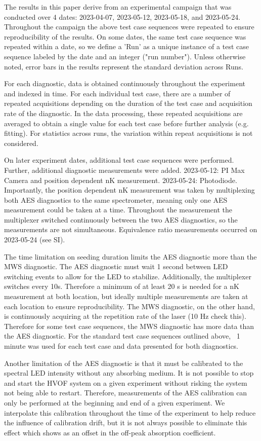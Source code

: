 The results in this paper derive from an experimental campaign that was conducted over 4 dates: 2023-04-07, 2023-05-12, 2023-05-18, and 2023-05-24. Throughout the campaign the above test case sequences were repeated to ensure reproducibility of the results. On some dates, the same test case sequence was repeated within a date, so we define a 'Run' as a unique instance of a test case sequence labeled by the date and an integer ("run number").  Unless otherwise noted, error bars in the results represent the standard deviation across Runs. 

For each diagnostic, data is obtained continuously throughout the experiment and indexed in time. For each individual test case, there are a number of repeated acquisitions depending on the duration of the test case and acquisition rate of the diagnostic. In the data processing, these repeated acquisitions are averaged to obtain a single value for each test case before further analysis (e.g. fitting). For statistics across runs, the variation within repeat acquisitions is not considered. 

On later experiment dates, additional test case sequences were performed. Further, additional diagnostic measurements were added. 2023-05-12: PI Max Camera and position dependent nK measurement. 2023-05-24: Photodiode. Importantly, the position dependent nK measurement was taken by multiplexing both AES diagnostics to the same spectrometer, meaning only one AES measurement could be taken at a time. Throughout the measurement the multiplexer switched continuously between the two AES diagnostics, so the measurements are not simultaneous. Equivalence ratio measurements occurred on 2023-05-24 (see SI). 

The time limitation on seeding duration limits the AES diagnostic more than the MWS diagnostic. The AES diagnostic must wait 1 second between LED switching events to allow for the LED to stabilize. Additionally, the multiplexer switches every 10s. Therefore a minimum of at least 20 s is needed for a nK measurement at both location, but ideally multiple measurements are taken at each location to ensure reproducibility. The MWS diagnostic, on the other hand, is continuously acquiring at the repetition rate of the laser (10 Hz check this). Therefore for some test case sequences, the MWS diagnostic has more data than the AES diagnostic. For the standard test case sequences outlined above, ~1 minute was used for each test case and data presented for both diagnostics.  

Another limitation of the AES diagnostic is that it must be calibrated to the spectral LED intensity without any absorbing medium. It is not possible to stop and start the HVOF system on a given experiment without risking the system not being able to restart. Therefore, measurements of the AES calibration can only be performed at the beginning and end of a given experiment. We interpolate this calibration throughout the time of the experiment to help reduce the influence of calibration drift, but it is not always possible to eliminate this effect which shows as an offset in the off-peak absorption coefficient.

